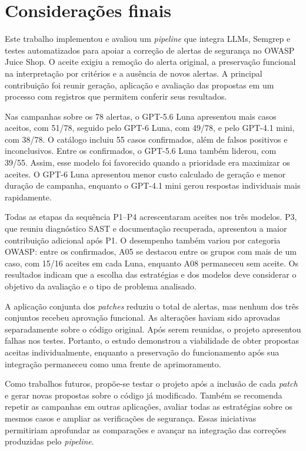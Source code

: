 

\chapter{Considerações finais}

\label{cap:consideracoes-finais}

Este trabalho implementou e avaliou um \textit{pipeline} que integra LLMs, Semgrep e testes automatizados para apoiar a correção de alertas de segurança no OWASP Juice Shop. O aceite exigiu a remoção do alerta original, a preservação funcional na interpretação por critérios e a ausência de novos alertas. A principal contribuição foi reunir geração, aplicação e avaliação das propostas em um processo com registros que permitem conferir seus resultados.

Nas campanhas sobre os 78 alertas, o GPT-5.6 Luna apresentou mais casos aceitos, com 51/78, seguido pelo GPT-6 Luna, com 49/78, e pelo GPT-4.1 mini, com 38/78. O catálogo incluiu 55 casos confirmados, além de falsos positivos e inconclusivos. Entre os confirmados, o GPT-5.6 Luna também liderou, com 39/55. Assim, esse modelo foi favorecido quando a prioridade era maximizar os aceites. O GPT-6 Luna apresentou menor custo calculado de geração e menor duração de campanha, enquanto o GPT-4.1 mini gerou respostas individuais mais rapidamente.

Todas as etapas da sequência P1--P4 acrescentaram aceites nos três modelos. P3, que reuniu diagnóstico SAST e documentação recuperada, apresentou a maior contribuição adicional após P1. O desempenho também variou por categoria OWASP: entre os confirmados, A05 se destacou entre os grupos com mais de um caso, com 15/16 aceites em cada Luna, enquanto A08 permaneceu sem aceite. Os resultados indicam que a escolha das estratégias e dos modelos deve considerar o objetivo da avaliação e o tipo de problema analisado.

A aplicação conjunta dos \textit{patches} reduziu o total de alertas, mas nenhum dos três conjuntos recebeu aprovação funcional. As alterações haviam sido aprovadas separadamente sobre o código original. Após serem reunidas, o projeto apresentou falhas nos testes. Portanto, o estudo demonstrou a viabilidade de obter propostas aceitas individualmente, enquanto a preservação do funcionamento após sua integração permaneceu como uma frente de aprimoramento.

Como trabalhos futuros, propõe-se testar o projeto após a inclusão de cada \textit{patch} e gerar novas propostas sobre o código já modificado. Também se recomenda repetir as campanhas em outras aplicações, avaliar todas as estratégias sobre os mesmos casos e ampliar as verificações de segurança. Essas iniciativas permitiriam aprofundar as comparações e avançar na integração das correções produzidas pelo \textit{pipeline}.
